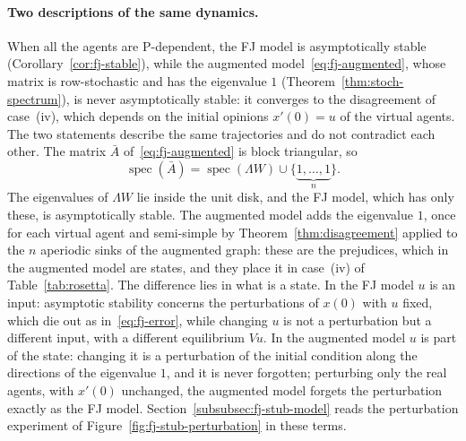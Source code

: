 \paragraph{Two descriptions of the same dynamics.}
When all the agents are P-dependent, the FJ model is asymptotically stable
(Corollary~\ref{cor:fj-stable}), while the augmented model~\eqref{eq:fj-augmented}, whose
matrix is row-stochastic and has the eigenvalue $1$ (Theorem~\ref{thm:stoch-spectrum}),
is never asymptotically stable: it converges to the disagreement of case~(iv), which
depends on the initial opinions $x'(0) = u$ of the virtual agents. The two statements
describe the same trajectories and do not contradict each other.
The matrix $\bar A$ of~\eqref{eq:fj-augmented} is block triangular, so
\[
  \operatorname{spec}(\bar A) = \operatorname{spec}(\Lambda W) \cup
  \{\underbrace{1, \dots, 1}_{n}\}.
\]
The eigenvalues of $\Lambda W$ lie inside the unit disk, and the FJ model, which has only
these, is asymptotically stable. The augmented model adds the eigenvalue $1$, once for
each virtual agent and semi-simple by Theorem~\ref{thm:disagreement} applied to the $n$
aperiodic sinks of the augmented graph: these are the prejudices, which in the
augmented model are states, and they place it in case~(iv) of
Table~\ref{tab:rosetta}.
The difference lies in what is a state. In the FJ model $u$ is an
input: asymptotic stability concerns the perturbations of $x(0)$ with $u$ fixed, which
die out as in~\eqref{eq:fj-error}, while changing $u$ is not a perturbation but a
different input, with a different equilibrium $Vu$. In the augmented model $u$ is part
of the state: changing it is a perturbation of the initial condition along the
directions of the eigenvalue $1$, and it is never forgotten; perturbing only the real
agents, with $x'(0)$ unchanged, the augmented model forgets the perturbation exactly as
the FJ model. Section~\ref{subsubsec:fj-stub-model} reads the perturbation experiment
of Figure~\ref{fig:fj-stub-perturbation} in these terms.

